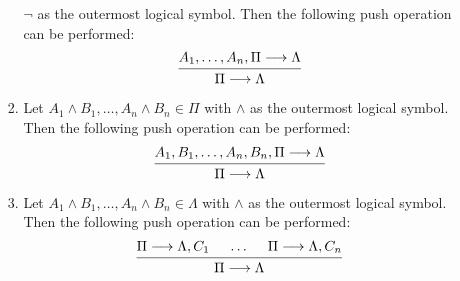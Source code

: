 \documentclass[11pt,a4paper]{article}
\begin{document}
\begin{definition}
\begin{enumerate}
\begin{enumerate}
\begin{enumerate}
                            \(\lnot\) as the outermost logical symbol.
                            Then the following push operation can be performed:
                            \begin{equation}
                                \begin{prooftree}
                                    \tag{reduction:\(\lnot\):right}
                                    \label{eq:reduction:lnot:right}
                                    \hypo{A_1,\ldots,A_n,\Pi\seq\Lambda}
                                    \infer1{\Pi\seq\Lambda}
                                \end{prooftree}
                            \end{equation}
                        \item\label{it:reduction tree land left}
                            Let \(A_1\land B_1,\ldots,A_n\land B_n\in\Pi\) with
                            \(\land\) as the outermost logical symbol.
                            Then the following push operation can be performed:
                            \begin{equation}
                                \begin{prooftree}
                                    \tag{reduction:\(\land\):left}
                                    \label{eq:reduction:land:left}
                                    \hypo{A_1, B_1,\ldots,A_n, B_n,\Pi\seq\Lambda}
                                    \infer1{\Pi\seq\Lambda}
                                \end{prooftree}
                            \end{equation}
                        \item\label{it:reduction tree land right}
                            Let \(A_1\land B_1,\ldots,A_n\land B_n\in\Lambda\) with
                            \(\land\) as the outermost logical symbol.
                            Then the following push operation can be performed:
                            \begin{equation}
                                \begin{prooftree}
                                    \tag{reduction:\(\land\):right}
                                    \label{eq:reduction:land:right}
                                    \hypo{\Pi\seq\Lambda,C_1}
                                    \hypo{\ldots}
                                    \hypo{\Pi\seq\Lambda,C_n}
                                    \infer3{\Pi\seq\Lambda}

\end{prooftree}
\end{equation}
\end{enumerate}
\end{enumerate}
\end{enumerate}
\end{definition}
\end{document}
